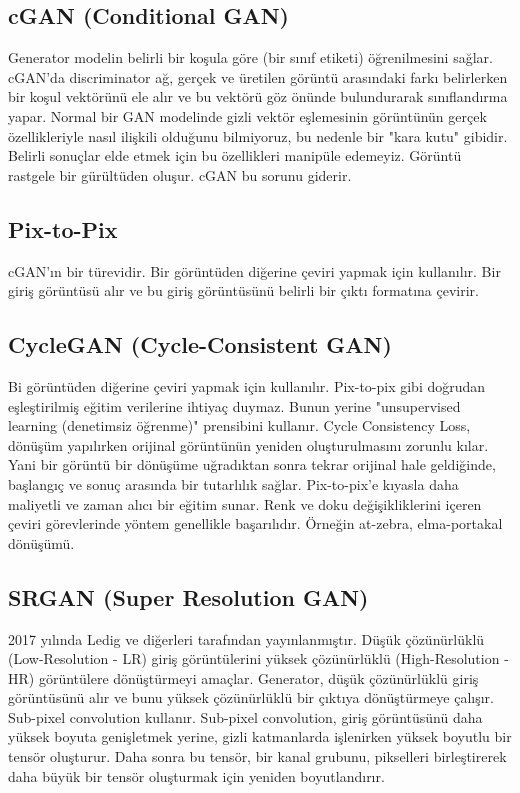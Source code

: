 \subsection{cGAN (Conditional GAN)}
Generator modelin belirli bir koşula göre (bir sınıf etiketi) öğrenilmesini sağlar. cGAN'da discriminator ağ, gerçek ve üretilen görüntü arasındaki farkı belirlerken bir koşul vektörünü ele alır ve bu vektörü göz önünde bulundurarak sınıflandırma yapar. Normal bir GAN modelinde gizli vektör eşlemesinin görüntünün gerçek özellikleriyle nasıl ilişkili olduğunu bilmiyoruz, bu nedenle bir "kara kutu" gibidir. Belirli sonuçlar elde etmek için bu özellikleri manipüle edemeyiz. Görüntü rastgele bir gürültüden oluşur. cGAN bu sorunu giderir.

\subsection{Pix-to-Pix}
cGAN'ın bir türevidir. Bir görüntüden diğerine çeviri yapmak için kullanılır. Bir giriş görüntüsü alır ve bu giriş görüntüsünü belirli bir çıktı formatına çevirir. 

\subsection{CycleGAN (Cycle-Consistent GAN)}
Bi görüntüden diğerine çeviri yapmak için kullanılır. Pix-to-pix gibi doğrudan eşleştirilmiş eğitim verilerine ihtiyaç duymaz. Bunun yerine "unsupervised learning (denetimsiz öğrenme)" prensibini kullanır. Cycle Consistency Loss, dönüşüm yapılırken orijinal görüntünün yeniden oluşturulmasını zorunlu kılar. Yani bir görüntü bir dönüşüme uğradıktan sonra tekrar orijinal hale geldiğinde, başlangıç ve sonuç arasında bir tutarlılık sağlar. Pix-to-pix'e kıyasla daha maliyetli ve zaman alıcı bir eğitim sunar. Renk ve doku değişikliklerini içeren çeviri görevlerinde yöntem genellikle başarılıdır. Örneğin at-zebra, elma-portakal dönüşümü.

\subsection{SRGAN (Super Resolution GAN)}
2017 yılında Ledig ve diğerleri tarafından yayınlanmıştır. Düşük çözünürlüklü (Low-Resolution - LR) giriş görüntülerini yüksek çözünürlüklü (High-Resolution - HR) görüntülere dönüştürmeyi amaçlar. Generator, düşük çözünürlüklü giriş görüntüsünü alır ve bunu yüksek çözünürlüklü bir çıktıya dönüştürmeye çalışır. Sub-pixel convolution kullanır. Sub-pixel convolution, giriş görüntüsünü daha yüksek boyuta genişletmek yerine, gizli katmanlarda işlenirken yüksek boyutlu bir tensör oluşturur. Daha sonra bu tensör, bir kanal grubunu, pikselleri birleştirerek daha büyük bir tensör oluşturmak için yeniden boyutlandırır.

